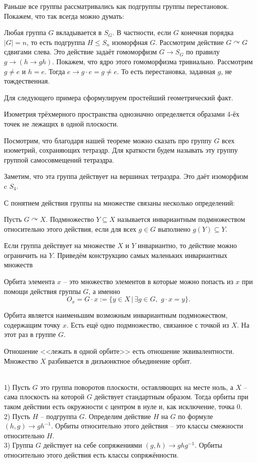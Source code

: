 Раньше все группы рассматривались как подгруппы группы перестановок. Покажем, что так всегда можно думать:

 Любая  группа $G$ вкладывается в $S_G$. В частности, если $G$ конечная порядка $|G|=n$, то есть подгруппа  $H \leq S_n$ изоморфная $G$.
\ecrl
\proof Рассмотрим действие $G \curvearrowright G$ сдвигами слева. Это действие задаёт гомоморфизм $G \to S_G$ по правилу $g\to (h \to gh)$. Покажем, что ядро этого гомоморфизма тривиально. Рассмотрим $g\neq e$ и $h=e$. Тогда $e \to g\cdot e=g \neq e$. То есть перестановка, заданная $g$, не тождественная. 
\endproof

Для следующего примера сформулируем простейший геометрический факт.

\fct Изометрия трёхмерного пространства однозначно определяется образами 4-ёх точек не лежащих в одной плоскости.
\efct

Посмотрим, что благодаря нашей теореме можно сказать про группу $G$ всех изометрий, сохраняющих тетраэдр. Для краткости будем называть эту группу группой самосовмещений тетраэдра. 

Заметим, что эта группа действует на вершинах тетраэдра. Это даёт изоморфизм c $S_4$. 


\noindent С понятием действия группы на множестве связаны несколько определений:

\dfn Пусть $G\curvearrowright X$. Подмножество $Y\subseteq X$ называется инвариантным подмножеством относительно этого действия, если для всех $g\in G$ выполнено $g(Y)\subseteq Y$.
\edfn

Если группа действует на множестве $X$ и $Y$ инвариантно, то действие можно ограничить на $Y$. Приведём конструкцию самых маленьких инвариантных множеств


\dfn
Орбита элемента $x$ -- это множество элементов в которые можно попасть из $x$ при помощи действия группы $G$, а именно
$$O_x=G\cdot x:=\{y\in X \,|\, \exists g\in G, \,\, g\cdot x=y\}.$$
\edfn

Орбита является наименьшим возможным инвариантным подмножеством, содержащим точку $x$. Есть ещё одно подмножество, связанное с точкой из $X$. На этот раз в группе $G$.

\rm Отношение <<лежать в одной орбите>> есть отношение эквивалентности. Множество $X$ разбивается в дизъюнктное объединение орбит.
\erm

\exm\\
1) Пусть $G$ это группа поворотов плоскости, оставляющих на месте ноль, а $X$ -- сама плоскость на которой $G$ действует стандартным образом. Тогда орбиты при таком действии есть окружности с центром в нуле и, как исключение, точка $0$.\\
2) Пусть $H$ -- подгруппа $G$. Определим действие $H$ на $G$ по формуле $(h,g) \to gh^{-1}$. Орбиты относительно этого действия  -- это классы смежности относительно $H$.\\
3) Группа $G$ действует на себе сопряжениями $(g,h) \to ghg^{-1}$. Орбиты относительно этого действия есть классы сопряжённости.\\

